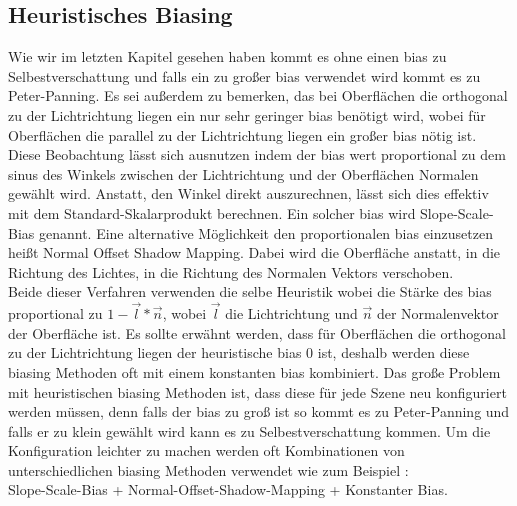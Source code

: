 \subsection{Heuristisches Biasing}
\label{section:heuristic-biasing}
Wie wir im letzten Kapitel gesehen haben kommt es ohne einen bias zu Selbestverschattung
und falls ein zu großer bias verwendet wird kommt es zu Peter-Panning.
Es sei außerdem zu bemerken, das bei Oberflächen die orthogonal zu der Lichtrichtung liegen 
ein nur sehr geringer bias benötigt wird, wobei für Oberflächen die parallel zu der Lichtrichtung 
liegen ein großer bias nötig ist.
Diese Beobachtung lässt sich ausnutzen indem der bias wert proportional zu dem sinus des Winkels zwischen
der Lichtrichtung und der Oberflächen Normalen gewählt wird.
Anstatt, den Winkel direkt auszurechnen, lässt sich dies effektiv mit dem Standard-Skalarprodukt berechnen.
Ein solcher bias wird Slope-Scale-Bias genannt.
Eine alternative Möglichkeit den proportionalen bias einzusetzen heißt Normal Offset Shadow Mapping.
Dabei wird die Oberfläche anstatt, in die Richtung des Lichtes, in die Richtung des Normalen Vektors 
verschoben.
\\
Beide dieser Verfahren verwenden die selbe Heuristik wobei die Stärke des bias 
proportional zu $1 - \overrightarrow{l} * \overrightarrow{n}$, wobei $\overrightarrow{l}$ 
die Lichtrichtung und $\overrightarrow{n}$ der Normalenvektor der Oberfläche ist.
Es sollte erwähnt werden, dass für Oberflächen die orthogonal zu der Lichtrichtung liegen
der heuristische bias 0 ist,
deshalb werden diese biasing Methoden oft mit einem konstanten bias kombiniert.
Das große Problem mit heuristischen biasing Methoden ist, dass 
diese für jede Szene neu konfiguriert werden müssen,
denn falls der bias zu groß ist so kommt es zu Peter-Panning und falls er zu klein gewählt 
wird kann es zu Selbestverschattung kommen.
Um die Konfiguration leichter zu machen werden oft Kombinationen 
von unterschiedlichen biasing Methoden verwendet wie zum Beispiel : \\
Slope-Scale-Bias + Normal-Offset-Shadow-Mapping + Konstanter Bias.

